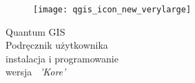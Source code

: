 
\begin{titlepage}
\begin{center}

\begin{figure}[H]
\begin{center}
\texttt{[image: qgis\_icon\_new\_verylarge]} 
\end{center}
\end{figure}

\Huge{Quantum GIS}\\
\vspace{0.5cm}
\Large{Podręcznik użytkownika\\instalacja i programowanie} \\
\vspace{0.5cm}
\Large{wersja ~\CURRENT \textsl{'Kore'}}

\end{center}
\end{titlepage}
